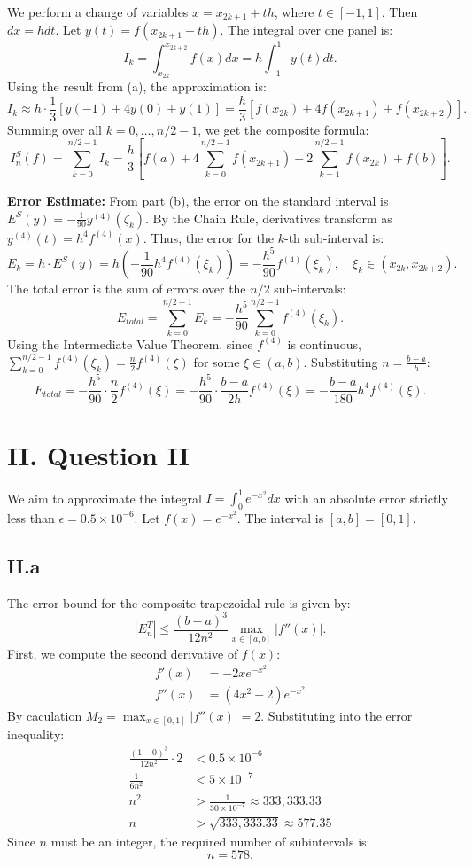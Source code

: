 \documentclass[a4paper]{article}
\begin{document}
We perform a change of variables $x = x_{2k+1} + th$, where $t \in [-1, 1]$. Then $dx = h dt$. Let $y(t) = f(x_{2k+1} + th)$.
The integral over one panel is:
\[
I_k = \int_{x_{2k}}^{x_{2k+2}} f(x) dx = h \int_{-1}^{1} y(t) dt.
\]
Using the result from (a), the approximation is:
\[
I_k \approx h \cdot \frac{1}{3} [y(-1) + 4y(0) + y(1)] = \frac{h}{3} [f(x_{2k}) + 4f(x_{2k+1}) + f(x_{2k+2})].
\]
Summing over all $k = 0, \dots, n/2 - 1$, we get the composite formula:
\[
I_n^S(f) = \sum_{k=0}^{n/2-1} I_k = \frac{h}{3} \left[ f(a) + 4\sum_{k=0}^{n/2-1} f(x_{2k+1}) + 2\sum_{k=1}^{n/2-1} f(x_{2k}) + f(b) \right].
\]

\textbf{Error Estimate:}
From part (b), the error on the standard interval is $E^S(y) = -\frac{1}{90} y^{(4)}(\zeta_k)$.
By the Chain Rule, derivatives transform as $y^{(4)}(t) = h^4 f^{(4)}(x)$.
Thus, the error for the $k$-th sub-interval is:
\[
E_k = h \cdot E^S(y) = h \left( -\frac{1}{90} h^4 f^{(4)}(\xi_k) \right) = -\frac{h^5}{90} f^{(4)}(\xi_k), \quad \xi_k \in (x_{2k}, x_{2k+2}).
\]
The total error is the sum of errors over the $n/2$ sub-intervals:
\[
E_{total} = \sum_{k=0}^{n/2-1} E_k = -\frac{h^5}{90} \sum_{k=0}^{n/2-1} f^{(4)}(\xi_k).
\]
Using the Intermediate Value Theorem, since $f^{(4)}$ is continuous, $\sum_{k=0}^{n/2-1} f^{(4)}(\xi_k) = \frac{n}{2} f^{(4)}(\xi)$ for some $\xi \in (a, b)$.
Substituting $n = \frac{b-a}{h}$:
\[
E_{total} = -\frac{h^5}{90} \cdot \frac{n}{2} f^{(4)}(\xi) = -\frac{h^5}{90} \cdot \frac{b-a}{2h} f^{(4)}(\xi) = -\frac{b-a}{180} h^4 f^{(4)}(\xi).
\]


\section*{II. Question II}
We aim to approximate the integral $I = \int_{0}^{1} e^{-x^2} dx$ with an absolute error strictly less than $\epsilon = 0.5 \times 10^{-6}$.
Let $f(x) = e^{-x^2}$. The interval is $[a, b] = [0, 1]$.

\subsection*{II.a}
The error bound for the composite trapezoidal rule is given by:
\[
|E_n^T| \le \frac{(b-a)^3}{12n^2} \max_{x \in [a, b]} |f''(x)|.
\]
First, we compute the second derivative of $f(x)$:
\begin{align*}
f'(x) &= -2x e^{-x^2} \\
f''(x) &= (4x^2 - 2)e^{-x^2}
\end{align*}
By caculation $M_2 = \max_{x \in [0, 1]} |f''(x)|=2$.
Substituting into the error inequality:
\begin{align*}
\frac{(1-0)^3}{12n^2} \cdot 2 &< 0.5 \times 10^{-6} \\
\frac{1}{6n^2} &< 5 \times 10^{-7} \\
n^2 &> \frac{1}{30 \times 10^{-7}} \approx 333,333.33 \\
n &> \sqrt{333,333.33} \approx 577.35
\end{align*}
Since $n$ must be an integer, the required number of subintervals is:
\[
n = 578.
\]
\end{document}
